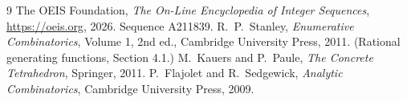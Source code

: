 \documentclass[11pt,a4paper]{article}
\theoremstyle{plain}
\theoremstyle{definition}
\begin{document}
\begin{thebibliography}{9}
 The OEIS Foundation, \emph{The On-Line Encyclopedia of Integer
Sequences}, \url{https://oeis.org}, 2026. Sequence A211839.
 R.~P.~Stanley, \emph{Enumerative Combinatorics}, Volume 1, 2nd ed.,
Cambridge University Press, 2011. (Rational generating functions, Section 4.1.)
 M.~Kauers and P.~Paule, \emph{The Concrete Tetrahedron}, Springer, 2011.
 P.~Flajolet and R.~Sedgewick, \emph{Analytic Combinatorics}, Cambridge
University Press, 2009.
\end{thebibliography}
\end{document}
